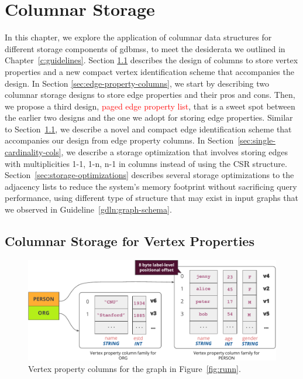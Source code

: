 \chapter{Columnar Storage}
\label{c:columnar-storage}

In this chapter, we explore the application of columnar data structures for different storage components of  \gls{gdbms}s, to meet the desiderata we outlined in Chapter~\ref{c:guidelines}. Section \ref{sec:vertex-property-columns} describes the design of columns to store vertex properties and a new compact vertex identification scheme that accompanies the design. In Section \ref{sec:edge-property-columns}, we start by describing two columnar storage designs to store edge properties and their pros and cons. Then, we propose a third design, \textcolor{red}{paged edge property list}, that is a sweet spot between the earlier two designs and the one we adopt for storing edge properties. Similar to Section~\ref{sec:vertex-property-columns}, we describe a novel and compact edge identification scheme that accompanies our design from edge property columns. In Section~\ref{sec:single-cardinality-cols}, we describe a storage optimization that involves storing edges with multiplicities 1-1, 1-n, n-1 in columns instead of using the CSR structure. Section~\ref{sec:storage-optimizations} describes several storage optimizations to the adjacency lists to reduce the system's memory footprint without sacrificing query performance, using different type of structure that may exist in input graphs that we observed in Guideline~\ref{gdln:graph-schema}.

\section{Columnar Storage for Vertex Properties}
\label{sec:vertex-property-columns}

\begin{figure}
	\hfill\includegraphics[scale=0.85]{img/vpcols}\hspace*{\fill}
	\caption{Vertex property columns for the graph in Figure~\ref{fig:runn}. }
	\label{fig:vpcols}
\end{figure}


